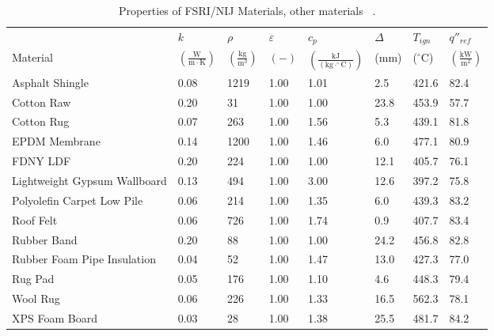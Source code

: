 \clearpage


\begin{table}[!h]
\caption[Properties of FSRI/NIJ Materials, other materials]{Properties of FSRI/NIJ Materials, other materials ~\cite{McKinnon:FSRI2023_Data}.}
\centering
\begin{tabular}{|p{5.5cm}|p{1.0cm}|p{1.0cm}|p{0.8cm}|p{1.4cm}|p{1.0cm}|p{1.0cm}|p{1.2cm}|}
\hline
                                               & $k$    & $\rho$      & $\varepsilon$   & $c_{p}$ & $\Delta$    & $T_{ign}$ & $q''_{ref}$ \\
Material                                       & $\mathrm{\left(\frac{W}{m\cdot K}\right)}$ & $\mathrm{\left(\frac{kg}{m^{3}}\right)}$ & $\mathrm{( - )}$ & $\mathrm{\left(\frac{kJ}{(kg\cdot ^{\circ}C)}\right)}$ &  ($\mathrm{mm}$)   & ($\mathrm{^{\circ}C}$) & $\mathrm{\left(\frac{kW}{m^{2}}\right)}$ \\ \hline
\hline
Asphalt Shingle & 0.08 & 1219 & 1.00 & 1.01 & 2.5& 421.6 & 82.4 \\ \hline
Cotton Raw & 0.20 & 31 & 1.00 & 1.00 & 23.8 & 453.9 & 57.7 \\ \hline
Cotton Rug & 0.07 & 263 & 1.00 & 1.56 & 5.3 & 439.1 & 81.8 \\ \hline
EPDM Membrane & 0.14 & 1200 & 1.00 & 1.46 & 6.0 & 477.1 & 80.9 \\ \hline
FDNY LDF & 0.20 & 224 & 1.00 & 1.00 & 12.1 & 405.7 & 76.1 \\ \hline
Lightweight Gypsum Wallboard & 0.13 & 494 & 1.00 & 3.00 & 12.6 & 397.2 & 75.8 \\ \hline
Polyolefin Carpet Low Pile & 0.06 & 214 & 1.00 & 1.35 & 6.0 & 439.3 & 83.2 \\ \hline
Roof Felt & 0.06 & 726 & 1.00 & 1.74 & 0.9 & 407.7 & 83.4 \\ \hline
Rubber Band & 0.20 & 88 & 1.00 & 1.00 & 24.2 & 456.8 & 82.8 \\ \hline
Rubber Foam Pipe Insulation & 0.04 & 52 & 1.00 & 1.47 & 13.0 & 427.3 & 77.0 \\ \hline
Rug Pad & 0.05 & 176 & 1.00 & 1.10 & 4.6 & 448.3 & 79.4 \\ \hline
Wool Rug & 0.06 & 226 & 1.00 & 1.33 & 16.5 & 562.3 & 78.1 \\ \hline
XPS Foam Board & 0.03 & 28 & 1.00 & 1.38 & 25.5 & 481.7 & 84.2 \\ \hline
\end{tabular}
\label{Properties_FSRI_NIJ_Materials_others}
\end{table}

